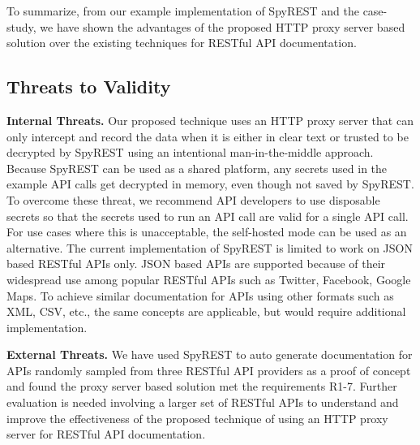 \documentclass[conference]{IEEEtran}
\begin{document}
To summarize, from our example implementation of SpyREST and the case-study, we have shown the advantages of the proposed HTTP proxy server based solution over the existing techniques for RESTful API documentation.

\subsection{Threats to Validity} %
\label{sub:threats_to_validity}

\textbf{Internal Threats.} Our proposed technique uses an HTTP proxy server that can only intercept and record the data when it is either in clear text or trusted to be decrypted by SpyREST using an intentional man-in-the-middle approach. Because SpyREST can be used as a shared platform, any secrets used in the example API calls get decrypted in memory, even though not saved by SpyREST. To overcome these threat, we recommend API developers to use disposable secrets so that the secrets used to run an API call are valid for a single API call. For use cases where this is unacceptable, the self-hosted mode can be used as an alternative. The current implementation of SpyREST is limited to work on JSON based RESTful APIs only. JSON based APIs are supported because of their widespread use among popular RESTful APIs such as Twitter, Facebook, Google Maps. To achieve similar documentation for APIs using other formats such as XML, CSV, etc., the same concepts are applicable, but would require additional implementation.

\textbf{External Threats.}  We have used SpyREST to auto generate documentation for APIs randomly sampled from three RESTful API providers as a proof of concept and found the proxy server based solution met the requirements R1-7. Further evaluation is needed involving a larger set of RESTful APIs to understand and improve the effectiveness of the proposed technique of using an HTTP proxy server for RESTful API documentation.
\end{document}
